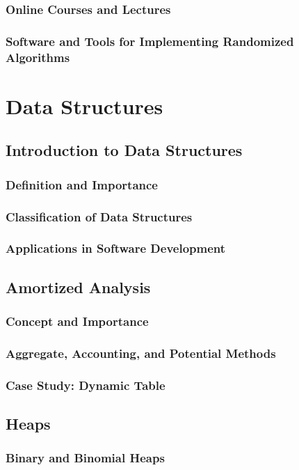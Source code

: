 \documentclass[12pt]{book} %
\begin{document}
\subsection{Online Courses and Lectures}
\subsection{Software and Tools for Implementing Randomized Algorithms}


\chapter{Data Structures}

\section{Introduction to Data Structures}
\subsection{Definition and Importance}
\subsection{Classification of Data Structures}
\subsection{Applications in Software Development}

\section{Amortized Analysis}
\subsection{Concept and Importance}
\subsection{Aggregate, Accounting, and Potential Methods}
\subsection{Case Study: Dynamic Table}

\section{Heaps}
\subsection{Binary and Binomial Heaps}
\end{document}
